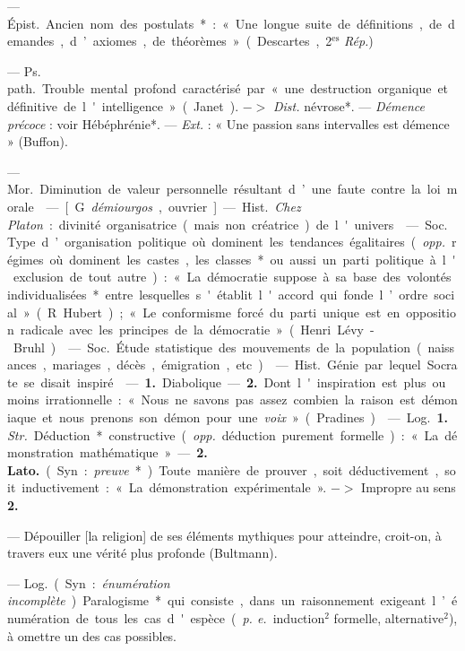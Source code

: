 \begin{itemize}[leftmargin=1cm, label=, itemsep=1pt]
 — \si{Épist.} Ancien nom des postulats* : « Une longue suite de
définitions, de demandes, d’axiomes, de théorèmes... » (Descartes,
2$^\text{es}$ {\it Rép.})

 — \si{Ps. path.} Trouble mental
profond caractérisé par « une destruction organique et définitive de
l'intelligence » (Janet). $->$ {\it Dist.}
névrose*. — {\it Démence précoce} : voir
Hébéphrénie*. — {\it Ext.} : « Une passion sans intervalles est démence »
(Buffon).

 — \si{Mor.} Diminution de
valeur personnelle résultant d’une
faute contre la loi morale.

 — [G. {\it démiourgos}, ouvrier]
— \si{Hist.} {\it Chez Platon} : divinité organisatrice
(mais non créatrice) de l'univers.

 — \si{Soc.} Type d’organisation politique où dominent les
tendances égalitaires ({\it opp.} régimes
où dominent les castes, les classes*
ou aussi un parti politique à l'exclusion de tout autre) : « La démocratie suppose à sa base des volontés
individualisées* entre lesquelles
s'établit l'accord qui fonde l’ordre
social » (R. Hubert); « Le conformisme forcé du parti unique est
en opposition radicale avec les principes de la démocratie » (Henri
Lévy-Bruhl).

 — \si{Soc.} Étude statistique des mouvements de la population (naissances, mariages, décès, émigration, etc.).

 — \si{Hist.} Génie par
lequel Socrate se disait inspiré.

 — {\bf 1.} Diabolique. — {\bf 2.}
Dont l'inspiration est plus ou moins
irrationnelle : « Nous ne savons pas
assez combien la raison est démoniaque et nous prenons son démon
pour une {\it voix} » (Pradines).

 — \si{Log.} {\bf 1.} {\it Str.} Déduction* constructive ({\it opp.} déduction
purement formelle) : « La démonstration mathématique ». — {\bf 2. Lato.}
(Syn. : {\it preuve}*). Toute manière de
prouver, soit déductivement, soit
inductivement : « La démonstration
expérimentale ». $->$ Impropre au
sens {\bf 2.}

 — Dépouiller [la religion] de ses éléments mythiques pour
atteindre, croit-on, à travers eux une vérité plus profonde (Bultmann).

 — \si{Log.} (Syn. : {\it énumération incomplète}).
Paralogisme* qui consiste, dans un
raisonnement exigeant l’énumération de tous les cas d'espèce ({\it p. e.}
induction$^2$ formelle, alternative$^2$), à omettre un des cas possibles.


\end{itemize}
